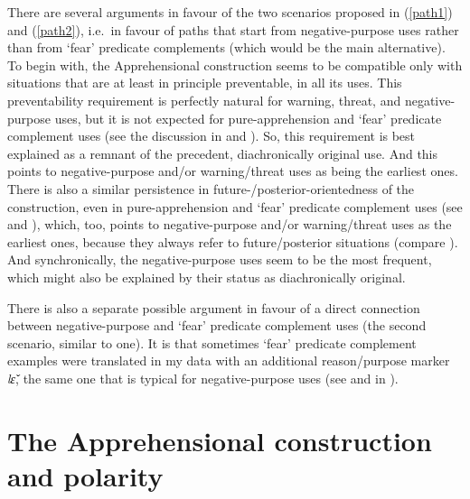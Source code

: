 \documentclass[output=paper,colorlinks,citecolor=brown]{langscibook}
\begin{document}
There are several arguments in favour of the two scenarios proposed in (\ref{path1}) and (\ref{path2}), i.e.\ in favour of paths that start from negative-purpose uses rather than from `fear' predicate complements (which would be the main alternative). To begin with, the Apprehensional construction seems to be compatible only with situations that are at least in principle preventable, in all its uses. This preventability requirement is perfectly natural for warning, threat, and negative-purpose uses, but it is not expected for pure-apprehension and `fear' predicate complement uses (see the discussion in  and ). So, this requirement is best explained as a remnant of the precedent, diachronically original use. And this points to negative-purpose and\slash or warning\slash threat uses as being the earliest ones. There is also a similar persistence in \mbox{future-}\slash posterior-orientedness of the construction, even in pure-apprehension and `fear' predicate complement uses (see  and ), which, too, points to negative-purpose and/or warning\slash threat uses as the earliest ones, because they always refer to future\slash posterior situations (compare \cite[320]{lichtenberk1995}). And synchronically, the negative-purpose uses seem to be the most frequent, which might also be explained by their status as diachronically original.

There is also a separate possible argument in favour of a direct connection between negative-purpose and `fear' predicate complement uses (the second scenario, similar to  one). It is that sometimes `fear' predicate complement examples were translated in my data with an additional reason\slash purpose marker \textit{lɛ̌}, the same one that is typical for negative-purpose uses (see  and  in ).


\section{The Apprehensional construction and polarity}
\label{sec:fedotov:apprpolarity}
\end{document}
